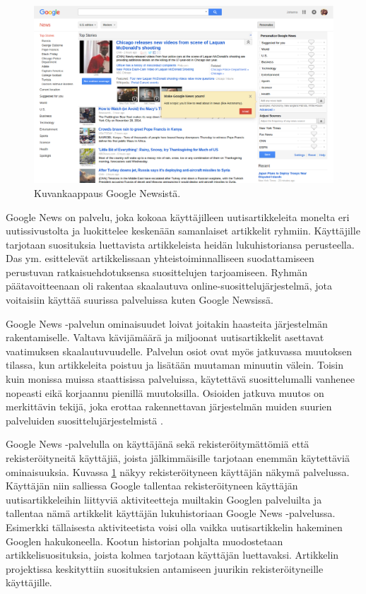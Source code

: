 \documentclass[12pt,finnish]{tktltiki2}
\theoremstyle{definition}
\theoremstyle{remark}
\begin{document}
\begin{figure}[]
\includegraphics[width = 390pt]{googlenews.eps}\caption{Kuvankaappaus Google Newsistä.}
\label{googlenews}
\end{figure} 

Google News on palvelu, joka kokoaa käyttäjilleen uutisartikkeleita monelta eri uutissivustolta ja luokittelee keskenään samanlaiset artikkelit ryhmiin. Käyttäjille tarjotaan suosituksia luettavista artikkeleista heidän lukuhistoriansa perusteella. Das ym. \cite{Das:2007:GNP:1242572.1242610} esittelevät artikkelissaan yhteistoiminnalliseen suodattamiseen perustuvan ratkaisuehdotuksensa suosittelujen tarjoamiseen. Ryhmän päätavoitteenaan oli rakentaa skaalautuva online-suosittelujärjestelmä, jota voitaisiin käyttää suurissa palveluissa kuten Google Newsissä.

Google News -palvelun ominaisuudet loivat joitakin haasteita järjestelmän rakentamiselle. Valtava kävijämäärä ja miljoonat uutisartikkelit asettavat vaatimuksen skaalautuvuudelle. Palvelun osiot ovat myös jatkuvassa muutoksen tilassa, kun artikkeleita poistuu ja lisätään muutaman minuutin välein. Toisin kuin monissa muissa staattisissa palveluissa, käytettävä suosittelumalli vanhenee nopeasti eikä korjaannu pienillä muutoksilla. Osioiden jatkuva muutos on merkittävin tekijä, joka erottaa rakennettavan järjestelmän muiden suurien palveluiden suosittelujärjestelmistä \cite{Das:2007:GNP:1242572.1242610}.

Google News -palvelulla on käyttäjänä sekä rekisteröitymättömiä että rekisteröityneitä käyttäjiä, joista jälkimmäisille tarjotaan enemmän käytettäviä ominaisuuksia. Kuvassa \ref{googlenews} näkyy rekisteröityneen käyttäjän näkymä palvelussa. Käyttäjän niin salliessa Google tallentaa rekisteröityneen käyttäjän uutisartikkeleihin liittyviä aktiviteetteja muiltakin Googlen palveluilta ja tallentaa nämä artikkelit käyttäjän lukuhistoriaan Google News -palvelussa. Esimerkki tällaisesta aktiviteetista voisi olla vaikka uutisartikkelin hakeminen Googlen hakukoneella. Kootun historian pohjalta muodostetaan artikkelisuosituksia, joista kolmea tarjotaan käyttäjän luettavaksi. Artikkelin projektissa keskityttiin suosituksien antamiseen juurikin rekisteröityneille käyttäjille. 
\end{document}
